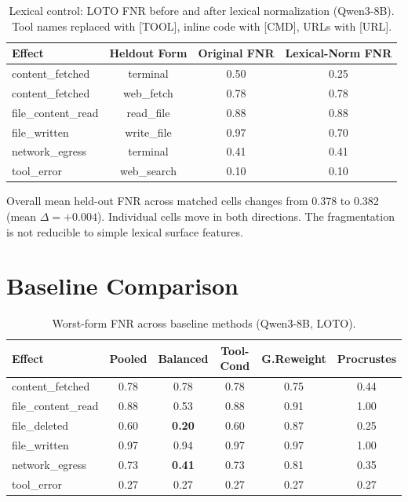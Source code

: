 \documentclass{article}
\begin{document}
\begin{table}[h]
\centering
\caption{Lexical control: LOTO FNR before and after lexical normalization (Qwen3-8B). Tool names replaced with [TOOL], inline code with [CMD], URLs with [URL].}
\label{tab:lexical}
\begin{tabular}{lccc}
\toprule
Effect & Heldout Form & Original FNR & Lexical-Norm FNR \\
\midrule
content\_fetched & terminal & 0.50 & 0.25 \\
content\_fetched & web\_fetch & 0.78 & 0.78 \\
file\_content\_read & read\_file & 0.88 & 0.88 \\
file\_written & write\_file & 0.97 & 0.70 \\
network\_egress & terminal & 0.41 & 0.41 \\
tool\_error & web\_search & 0.10 & 0.10 \\
\bottomrule
\end{tabular}
\end{table}

Overall mean held-out FNR across matched cells changes from 0.378 to 0.382 (mean $\Delta=+0.004$). Individual cells move in both directions. The fragmentation is not reducible to simple lexical surface features.

\section{Baseline Comparison}

\begin{table}[h]
\centering
\caption{Worst-form FNR across baseline methods (Qwen3-8B, LOTO).}
\label{tab:baselines}
\begin{tabular}{lccccc}
\toprule
Effect & Pooled & Balanced & Tool-Cond & G.Reweight & Procrustes \\
\midrule
content\_fetched & 0.78 & 0.78 & 0.78 & 0.75 & 0.44 \\
file\_content\_read & 0.88 & 0.53 & 0.88 & 0.91 & 1.00 \\
file\_deleted & 0.60 & \textbf{0.20} & 0.60 & 0.87 & 0.25 \\
file\_written & 0.97 & 0.94 & 0.97 & 0.97 & 1.00 \\
network\_egress & 0.73 & \textbf{0.41} & 0.73 & 0.81 & 0.35 \\
tool\_error & 0.27 & 0.27 & 0.27 & 0.27 & 0.27 \\
\bottomrule
\end{tabular}
\end{table}
\end{document}
